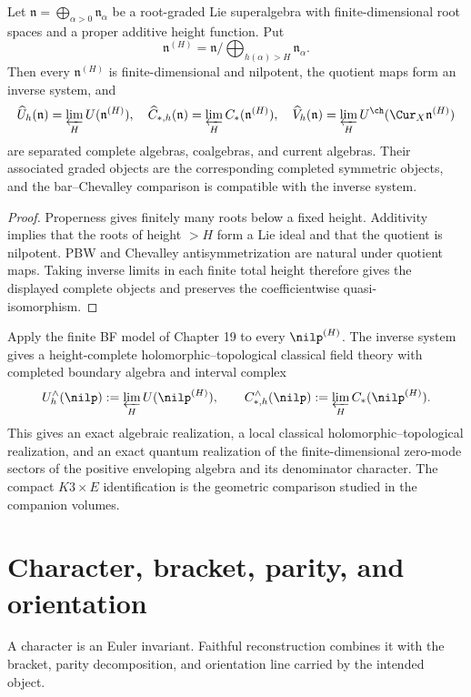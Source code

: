 \begin{theorem}
Let $\mathfrak n=\bigoplus_{\alpha>0}\mathfrak n_\alpha$ be a root-graded Lie superalgebra with finite-dimensional root spaces and a proper additive height function.  Put
\[
 \mathfrak n^{(H)}=\mathfrak n/\!\bigoplus_{h(\alpha)>H}\mathfrak n_\alpha.
\]
Then every $\mathfrak n^{(H)}$ is finite-dimensional and nilpotent, the quotient maps form an inverse system, and
\[
 \widehat U_h(\mathfrak n)=\varprojlim_HU(\mathfrak n^{(H)}),\quad
 \widehat C_{*,h}(\mathfrak n)=\varprojlim_HC_*(\mathfrak n^{(H)}),\quad
 \widehat V_h(\mathfrak n)=\varprojlim_HU^{\ch}(\Cur_X\mathfrak n^{(H)})
\]
are separated complete algebras, coalgebras, and current algebras.  Their associated graded objects are the corresponding completed symmetric objects, and the bar--Chevalley comparison is compatible with the inverse system.
\end{theorem}
\begin{proof}
Properness gives finitely many roots below a fixed height.  Additivity implies that the roots of height $>H$ form a Lie ideal and that the quotient is nilpotent.  PBW and Chevalley antisymmetrization are natural under quotient maps.  Taking inverse limits in each finite total height therefore gives the displayed complete objects and preserves the coefficientwise quasi-isomorphism.
\end{proof}

Apply the finite BF model of Chapter 19 to every $\nilp^{(H)}$. The inverse system gives a height-complete holomorphic--topological classical field theory with completed boundary algebra and interval complex
\[
 U_h^\wedge(\nilp):=\varprojlim_H U(\nilp^{(H)}),
 \qquad
 C_{*,h}^\wedge(\nilp):=\varprojlim_H C_*(\nilp^{(H)}).
\]
This gives an exact algebraic realization, a local classical holomorphic--topological realization, and an exact quantum realization of the finite-dimensional zero-mode sectors of the positive enveloping algebra and its denominator character. The compact $K3\times E$ identification is the geometric comparison studied in the companion volumes.

\chapter{Character, bracket, parity, and orientation}
A character is an Euler invariant.  Faithful reconstruction combines it with the bracket, parity decomposition, and orientation line carried by the intended object.

